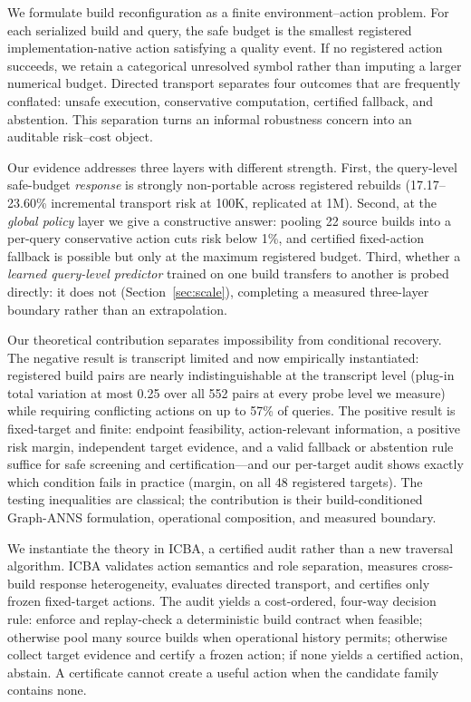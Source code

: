 \documentclass{article}
\begin{document}
We formulate build reconfiguration as a finite environment--action problem. For each serialized build and
query, the safe budget is the smallest registered implementation-native action satisfying a quality event.
If no registered action succeeds, we retain a categorical unresolved symbol rather than imputing a larger
numerical budget. Directed transport separates four outcomes that are frequently conflated: unsafe
execution, conservative computation, certified fallback, and abstention. This separation turns an informal
robustness concern into an auditable risk--cost object.

Our evidence addresses three layers with different strength. First, the query-level safe-budget
\emph{response} is strongly non-portable across registered rebuilds (17.17--23.60\% incremental transport
risk at 100K, replicated at 1M). Second, at the \emph{global policy} layer we give a constructive answer:
pooling 22 source builds into a per-query conservative action cuts risk below 1\%, and certified fixed-action
fallback is possible but only at the maximum registered budget. Third, whether a \emph{learned query-level
predictor} trained on one build transfers to another is probed directly: it does not
(Section~\ref{sec:scale}), completing a measured three-layer boundary rather than an extrapolation.

Our theoretical contribution separates impossibility from conditional recovery. The negative result is
transcript limited and now empirically instantiated: registered build pairs are nearly indistinguishable at
the transcript level (plug-in total variation at most 0.25 over all 552 pairs at every probe level we
measure) while requiring conflicting actions on up to 57\% of queries. The positive result is fixed-target
and finite: endpoint feasibility, action-relevant information, a positive risk margin, independent target
evidence, and a valid fallback or abstention rule suffice for safe screening and certification---and our
per-target audit shows exactly which condition fails in practice (margin, on all 48 registered targets).
The testing inequalities are classical; the contribution is their build-conditioned Graph-ANNS
formulation, operational composition, and measured boundary.

We instantiate the theory in ICBA, a certified audit rather than a new traversal algorithm. ICBA validates
action semantics and role separation, measures cross-build response heterogeneity, evaluates directed
transport, and certifies only frozen fixed-target actions. The audit yields a cost-ordered, four-way
decision rule: enforce and replay-check a deterministic build contract when feasible; otherwise pool many
source builds when operational history permits; otherwise collect target evidence and certify a frozen
action; if none yields a certified action, abstain. A certificate cannot create a useful action when the
candidate family contains none.
\end{document}
